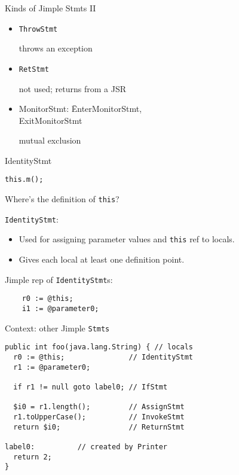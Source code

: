 \begin{slide}{Kinds of Jimple Stmts II}
\begin{itemize}
\item {\tt ThrowStmt}

\qquad throws an exception

\item {\tt RetStmt}

\qquad not used; returns from a JSR

\item {\tt \begin{tabbing}
MonitorStmt: \= EnterMonitorStmt, \\
                  \> ExitMonitorStmt
\end{tabbing}}

\qquad mutual exclusion
\end{itemize}
\end{slide}

\begin{slide}{IdentityStmt}
\begin{center}
{\tt this.m(); }
\end{center}

Where's the definition of {\tt this}?

\quad
\vspace*{-0.08in}

{\tt IdentityStmt}:
\begin{itemize}
\item Used for assigning parameter values and {\tt this} ref to locals.

\item Gives each local at least one definition point.
\end{itemize}

\vspace*{0.03in}
Jimple rep of {\tt IdentityStmt}s:
\begin{verbatim}
    r0 := @this;
    i1 := @parameter0;
\end{verbatim}
\end{slide}

\begin{slide}{Context: other Jimple {\tt Stmts}}
\vspace*{-0.15in}
{\small
\begin{verbatim}
public int foo(java.lang.String) { // locals
  r0 := @this;               // IdentityStmt
  r1 := @parameter0;

  if r1 != null goto label0; // IfStmt

  $i0 = r1.length();         // AssignStmt
  r1.toUpperCase();          // InvokeStmt
  return $i0;                // ReturnStmt

label0:          // created by Printer
  return 2;
}
\end{verbatim}}
\end{slide}

